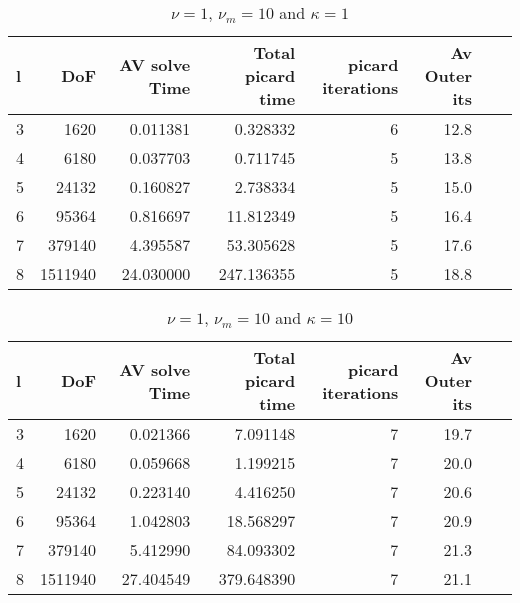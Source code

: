 \documentclass{article}
\begin{document}
\begin{table}
\begin{tabular}{lrrrrrll}
\hline
l &      DoF &  AV solve Time &  Total picard time &  picard iterations & Av Outer its \\
\hline
3 &     1620 &       0.011381 &           0.328332 &                  6 &         12.8 \\
4 &     6180 &       0.037703 &           0.711745 &                  5 &         13.8 \\
5 &    24132 &       0.160827 &           2.738334 &                  5 &         15.0 \\
6 &    95364 &       0.816697 &          11.812349 &                  5 &         16.4 \\
7 &   379140 &       4.395587 &          53.305628 &                  5 &         17.6 \\
8 &  1511940 &      24.030000 &         247.136355 &                  5 &         18.8 \\
\hline
\end{tabular}
\caption{$\nu=1$, $\nu_m = 10$ and $\kappa = 1$}
\end{table}


\begin{table}
\begin{tabular}{lrrrrrll}
\hline
l &      DoF &  AV solve Time &  Total picard time &  picard iterations & Av Outer its \\
\hline
3 &     1620 &       0.021366 &           7.091148 &                  7 &         19.7 \\
4 &     6180 &       0.059668 &           1.199215 &                  7 &         20.0 \\
5 &    24132 &       0.223140 &           4.416250 &                  7 &         20.6 \\
6 &    95364 &       1.042803 &          18.568297 &                  7 &         20.9 \\
7 &   379140 &       5.412990 &          84.093302 &                  7 &         21.3 \\
8 &  1511940 &      27.404549 &         379.648390 &                  7 &         21.1 \\
\hline
\end{tabular}
\caption{$\nu=1$, $\nu_m = 10$ and $\kappa = 10$}
\end{table}
\end{document}
